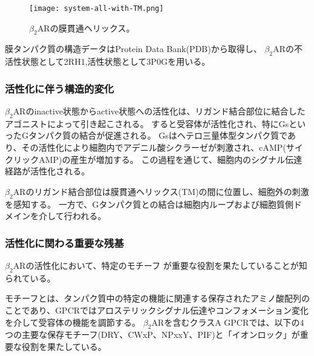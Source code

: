 \begin{figure}[htbp]
  \centering
  \texttt{[image: system-all-with-TM.png]}
  \caption{$\beta_2$ARの膜貫通ヘリックス。}
  \label{fig:all}
\end{figure}

\newpage

膜タンパク質の構造データはProtein Data Bank(PDB)から取得し、
$\beta_2$ARの不活性状態として2RH1\cite{cherezov2007},活性状態として3P0G\cite{rasmussen2011}を用いる。

\subsubsection{活性化に伴う構造的変化}
$\beta_2$ARのinactive状態からactive状態への活性化は、リガンド結合部位に結合したアゴニストによって引き起こされる。
すると受容体が活性化され、特にGsといったGタンパク質の結合が促進される。
Gsはヘテロ三量体型タンパク質であり、その活性化により細胞内でアデニル酸シクラーゼが刺激され、cAMP(サイクリックAMP)の産生が増加する。
この過程\cite{philip2007}を通じて、細胞内のシグナル伝達経路が活性化される。

$\beta_2$ARのリガンド結合部位は膜貫通ヘリックス(TM)の間に位置し、細胞外の刺激を感知する。
一方で、Gタンパク質との結合は細胞内ループおよび細胞質側ドメインを介して行われる。


\subsubsection{活性化に関わる重要な残基}
$\beta_2$ARの活性化において、特定のモチーフ\cite{nygaard2009ligand}\cite{lee2013mapping}
が重要な役割を果たしていることが知られている。

モチーフとは、タンパク質中の特定の機能に関連する保存されたアミノ酸配列のことであり、GPCRではアロステリックシグナル伝達やコンフォメーション変化を介して受容体の機能を調節する。
$\beta_2$ARを含むクラスA GPCRでは、以下の4つの主要な保存モチーフ(DRY、CWxP、NPxxY、PIF)と「イオンロック」が重要な役割を果たしている。

